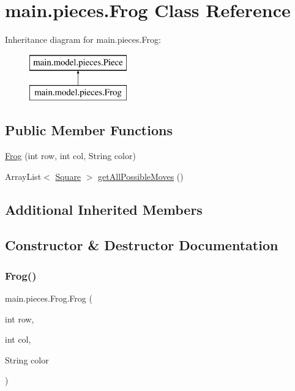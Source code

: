 \hypertarget{classmain_1_1pieces_1_1_frog}{}\section{main.\+pieces.\+Frog Class Reference}
\label{classmain_1_1pieces_1_1_frog}
Inheritance diagram for main.\+pieces.\+Frog\+:\begin{figure}[H]
\begin{center}
\leavevmode
\includegraphics[height=2.000000cm]{classmain_1_1pieces_1_1_frog}
\end{center}
\end{figure}
\subsection*{Public Member Functions}
\begin{DoxyCompactItemize}
\item 
\hyperlink{classmain_1_1pieces_1_1_frog_ab0359b42fe30d159dc6041ff49a0aef2}{Frog} (int row, int col, String color)
\item 
Array\+List$<$ \hyperlink{classmain_1_1_square}{Square} $>$ \hyperlink{classmain_1_1pieces_1_1_frog_a89b9515482edd874a06a3b13e90b8f8f}{get\+All\+Possible\+Moves} ()
\end{DoxyCompactItemize}
\subsection*{Additional Inherited Members}


\subsection{Constructor \& Destructor Documentation}
\mbox{\label{classmain_1_1pieces_1_1_frog_ab0359b42fe30d159dc6041ff49a0aef2}} 
\subsubsection{\texorpdfstring{Frog()}{Frog()}}
{\footnotesize\ttfamily main.\+pieces.\+Frog.\+Frog (\begin{DoxyParamCaption}\item[{int}]{row,  }\item[{int}]{col,  }\item[{String}]{color }\end{DoxyParamCaption})\hspace{0.3cm}{\ttfamily [inline]}}

